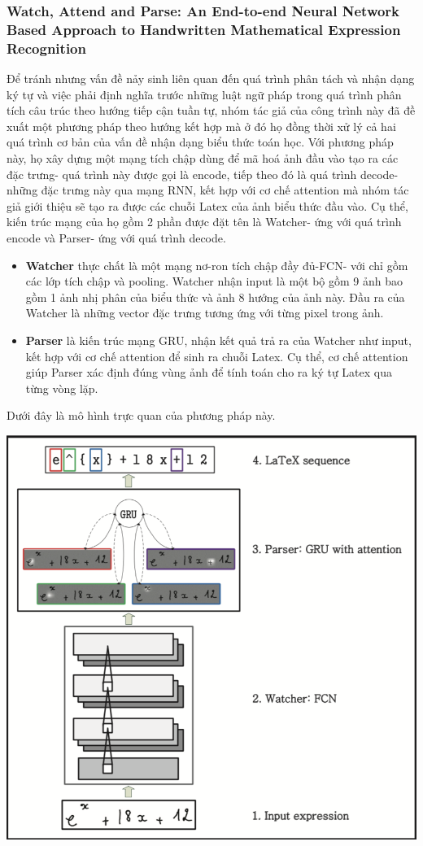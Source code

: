 \documentclass[a4paper]{article}
\theoremstyle{definition}
\begin{document}
	\subsubsection{Watch, Attend and Parse: An End-to-end Neural Network Based Approach to Handwritten Mathematical Expression Recognition\cite{zhang2017watch}} 
	Để tránh nhưng vấn đề nảy sinh liên quan đến quá trình phân tách và nhận dạng ký tự và việc phải định nghĩa trước những luật ngữ pháp trong quá trình phân tích câu trúc theo hướng tiếp cận tuần tự, nhóm tác giả của công trình này đã đề xuất một phương pháp theo hướng kết hợp mà ở đó họ đồng thời xử lý cả hai quá trình cơ bản của vấn đề nhận dạng biểu thức toán học. Với phương pháp này, họ xây dựng một mạng tích chập dùng để mã hoá ảnh đầu vào tạo ra các đặc trưng- quá trình này được gọi là encode, tiếp theo đó là quá trình decode- những đặc trưng này qua mạng RNN, kết hợp với cơ chế attention\cite{zhang2017watch} mà nhóm tác giả giới thiệu sẽ tạo ra được các chuỗi Latex của ảnh biểu thức đầu vào.
	Cụ thể, kiến trúc mạng của họ gồm 2 phần được đặt tên là Watcher- ứng với quá trình encode và Parser- ứng với quá trình decode.
	\begin{itemize}
		\item \textbf{Watcher} thực chất là một mạng nơ-ron tích chập đầy đủ-FCN- với chỉ gồm các lớp tích chập và pooling. Watcher nhận input là một bộ gồm 9 ảnh bao gồm 1 ảnh nhị phân của biểu thức và ảnh 8 hướng của ảnh này. Đầu ra của Watcher là những vector đặc trưng tương ứng với từng pixel trong ảnh. 
		\item \textbf{Parser} là kiến trúc mạng GRU\cite{cho2014properties}, nhận kết quả trả ra của Watcher như input, kết hợp với cơ chế attention để sinh ra chuỗi Latex. Cụ thể, cơ chế attention giúp Parser xác định đúng vùng ảnh để tính toán cho ra ký tự Latex qua từng vòng lặp.
	\end{itemize}
	Dưới đây là mô hình trực quan của phương pháp này.
	\begin{center}
		
		\centering
		\includegraphics[width=0.6\linewidth]{WAP}
		\vspace{0.5cm}
	\end{center}
	
\end{document}
